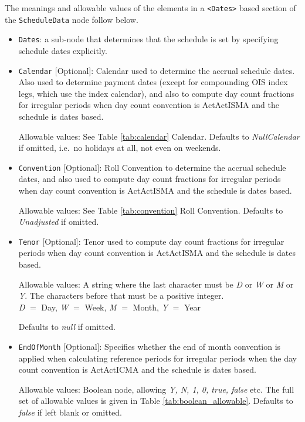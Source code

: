 \medskip
The meanings and allowable values of the elements in a {\tt <Dates>} based section of the  \lstinline!ScheduleData! node follow below.

\begin{itemize}

\item \lstinline!Dates!: a sub-node that determines that the schedule is set by specifying schedule dates explicitly. 

\item \lstinline!Calendar! [Optional]: Calendar used to determine the accrual schedule dates. Also used to determine payment dates (except for compounding OIS index legs, which use the index calendar), and also to compute day count fractions for irregular periods when day count convention is ActActISMA and the schedule is dates based. 

Allowable values: See Table \ref{tab:calendar} Calendar. Defaults to \emph{NullCalendar} if omitted, i.e.\ no holidays at all, not even on weekends.

\item \lstinline!Convention! [Optional]: Roll Convention to determine the accrual schedule dates, and also used to compute day count fractions for irregular periods when day count convention is ActActISMA and the schedule is dates based.

Allowable values: See Table
\ref{tab:convention} Roll Convention. Defaults to \emph{Unadjusted} if omitted.

\item \lstinline!Tenor! [Optional]: Tenor used to compute day count fractions for irregular periods when day count convention is ActActISMA and the schedule is dates based.

Allowable values: A string where the last character must be \emph{D} or \emph{W} or
\emph{M} or \emph{Y}.  The characters before that must be a positive integer. \\ \emph{D}
$=$ Day, \emph{W} $=$ Week, \emph{M} $=$ Month, \emph{Y} $=$ Year

Defaults to \emph{null} if omitted.

\item \lstinline!EndOfMonth! [Optional]: Specifies whether the end of month convention is applied when calculating reference periods
  for irregular periods when the day count convention is ActActICMA and the schedule is dates based.

Allowable values: Boolean node, allowing \emph{Y, N, 1, 0, true, false} etc. The full set of allowable values is given in Table \ref{tab:boolean_allowable}. Defaults to \emph{false} if left blank or omitted.


\end{itemize}
